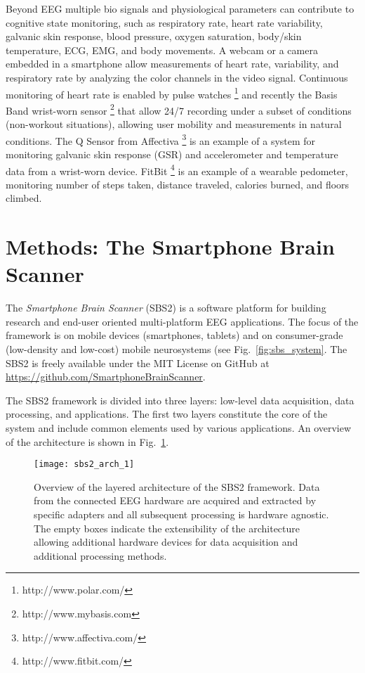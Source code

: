 \documentclass[10pt]{article}
\begin{document}
Beyond EEG multiple bio signals and physiological parameters can contribute to cognitive state monitoring, such as  respiratory rate\cite{Moraveji2012}, heart rate variability, galvanic skin response\cite{poh2010wearable}, blood pressure, oxygen saturation, body/skin temperature, ECG, EMG, and body movements\cite{Pantelopoulos2010}. A webcam or a camera embedded in a smartphone allow measurements of heart rate, variability, and respiratory rate by analyzing the color channels in the video signal\cite{poh2011advancements}. Continuous monitoring of heart rate is enabled by pulse watches \footnote{http://www.polar.com/} and recently the Basis Band wrist-worn sensor \footnote{http://www.mybasis.com} that allow 24/7 recording under a subset of conditions (non-workout situations), allowing user mobility and measurements in natural conditions. The Q Sensor from Affectiva \footnote{http://www.affectiva.com/} is an example of a system for monitoring galvanic skin response (GSR) and accelerometer and temperature data from a wrist-worn device. FitBit \footnote{http://www.fitbit.com/} is an example of a wearable pedometer, monitoring number of steps taken, distance traveled, calories burned, and floors climbed.

 \section{Methods: The Smartphone Brain Scanner}

The \emph{Smartphone Brain Scanner} (SBS2) is a software platform for building research and end-user oriented multi-platform EEG applications. The focus of the framework is on mobile devices (smartphones, tablets) and on consumer-grade (low-density and low-cost) mobile neurosystems (see Fig.~\ref{fig:sbs_system}. The SBS2 is freely available under the MIT License on GitHub at \url{https://github.com/SmartphoneBrainScanner}.

The SBS2 framework is divided into three layers: low-level data acquisition, data processing, and applications. The first two layers constitute the core of the system and include common elements used by various applications. An overview of the architecture is shown in Fig.~\ref{sbs2_arch_1}.

\begin{figure}[!t]
\centering
\texttt{[image: sbs2\_arch\_1]}
\caption{Overview of the layered architecture of the SBS2 framework. Data from the connected EEG hardware are acquired and extracted by specific adapters and all subsequent processing is hardware agnostic. The empty boxes indicate the extensibility of the architecture allowing additional hardware devices for data acquisition and additional processing methods.}
\label{sbs2_arch_1}
\end{figure}
\end{document}
